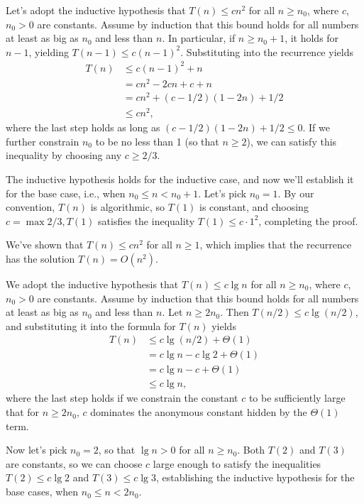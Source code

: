 \subexercise
Let's adopt the inductive hypothesis that $T(n)\le cn^2$ for all $n\ge n_0$, where $c$, $n_0>0$ are constants.
Assume by induction that this bound holds for all numbers at least as big as $n_0$ and less than $n$.
In particular, if $n\ge n_0+1$, it holds for $n-1$, yielding $T(n-1)\le c(n-1)^2$.
Substituting into the recurrence yields
\begin{align*}
    T(n) &\le c(n-1)^2+n \\
    &= cn^2-2cn+c+n \\
    &= cn^2+(c-1/2)(1-2n)+1/2 \\
    &\le cn^2,
\end{align*}
where the last step holds as long as $(c-1/2)(1-2n)+1/2\le0$.
If we further constrain $n_0$ to be no less than 1 (so that $n\ge2$), we can satisfy this inequality by choosing any $c\ge2/3$.

The inductive hypothesis holds for the inductive case, and now we'll establish it for the base case, i.e., when $n_0\le n<n_0+1$.
Let's pick $n_0=1$.
By our convention, $T(n)$ is algorithmic, so $T(1)$ is constant, and choosing $c=\max{2/3,T(1)}$ satisfies the inequality $T(1)\le c\cdot1^2$, completing the proof.

We've shown that $T(n)\le cn^2$ for all $n\ge1$, which implies that the recurrence has the solution $T(n)=O(n^2)$.

\subexercise
We adopt the inductive hypothesis that $T(n)\le c\lg n$ for all $n\ge n_0$, where $c$, $n_0>0$ are constants.
Assume by induction that this bound holds for all numbers at least as big as $n_0$ and less than $n$.
Let $n\ge2n_0$.
Then $T(n/2)\le c\lg(n/2)$, and substituting it into the formula for $T(n)$ yields
\begin{align*}
    T(n) &\le c\lg(n/2)+\Theta(1) \\
    &= c\lg n-c\lg2+\Theta(1) \\
    &= c\lg n-c+\Theta(1) \\
    &\le c\lg n,
\end{align*}
where the last step holds if we constrain the constant $c$ to be sufficiently large that for $n\ge2n_0$, $c$ dominates the anonymous constant hidden by the $\Theta(1)$ term.

Now let's pick $n_0=2$, so that $\lg n>0$ for all $n\ge n_0$.
Both $T(2)$ and $T(3)$ are constants, so we can choose $c$ large enough to satisfy the inequalities $T(2)\le c\lg2$ and $T(3)\le c\lg3$, establishing the inductive hypothesis for the base cases, when $n_0\le n<2n_0$.

